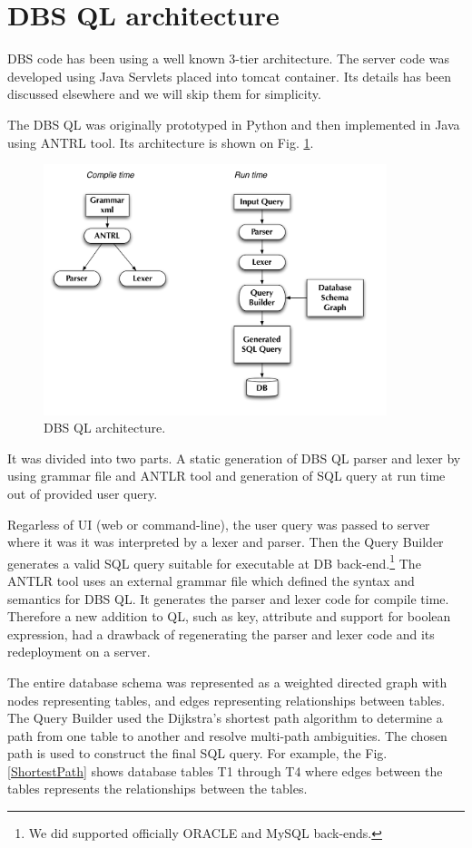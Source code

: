 \documentclass[a4paper]{jpconf}
\begin{document}
\section{DBS QL architecture}
DBS code has been using a well known 3-tier architecture. The server
code was developed using Java Servlets placed into tomcat container.
Its details has been discussed elsewhere\cite{DBS} and we will skip
them for simplicity. 

The DBS QL was originally prototyped in Python and then implemented
in Java using ANTRL tool. Its architecture is shown on Fig. \ref{DBS_QL}.
\begin{figure}[htb]
\centering
\includegraphics[width=100mm]{DBS_QL_architecture.pdf}
\caption{DBS QL architecture.}
\label{DBS_QL}
\end{figure}
It was divided into two parts. A static generation of DBS QL
parser and lexer by using grammar file and ANTLR tool\cite{ANTLR}
and generation of SQL query at run time out of provided user query.

Regarless of UI (web or command-line), the user query was 
passed to server where it was it was interpreted by a lexer and parser.
Then the Query Builder generates a valid SQL query suitable for
executable at DB back-end.\footnote{We did supported officially ORACLE and
MySQL back-ends.} 
The ANTLR tool uses an external grammar file which defined 
the syntax and semantics for DBS QL. It generates the parser and lexer 
code for compile time. Therefore a new addition to QL, such as key,
attribute and support for boolean expression, had a drawback of
regenerating the parser and lexer code and its redeployment on a server.
 
The entire database schema was represented as a weighted
directed graph with nodes representing tables, and edges 
representing relationships between tables. The Query Builder
used the Dijkstra’s shortest path algorithm to determine a 
path from one table to another and resolve multi-path ambiguities.
The chosen path is used to construct the final SQL query. 
For example, the Fig. \ref{ShortestPath} shows database tables 
T1 through T4  where edges between the tables represents the 
relationships between the tables.
\end{document}
